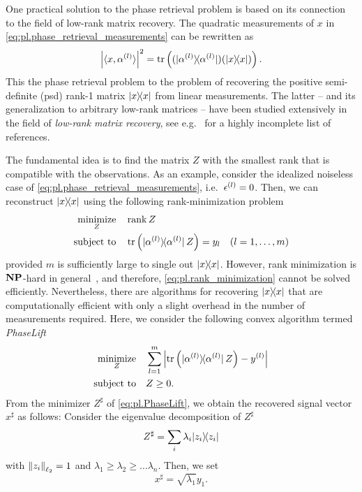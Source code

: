 One practical solution to the phase retrieval problem is based on its connection to the field of low-rank matrix recovery.
The quadratic measurements of $x$ in \cref{eq:pl.phase_retrieval_measurements} can be rewritten as
\[
  \left| \langle {x}, \alpha^{(l)} \rangle \right|^2
  = \tr \left( (\ket{\alpha^{(l)}}\bra{\alpha^{(l)}}) (\ket{{x}}\bra{{x}}) \right).
\]
This  the phase retrieval problem to the problem of recovering the positive semi-definite (psd) rank-1 matrix $\ketbra{x}$ from linear measurements.
The latter -- and its generalization to arbitrary low-rank matrices -- have been studied extensively in the field of \emph{low-rank matrix recovery}, see e.g.~\cite{Ahmed_2014_Blind,Candes_2009_Exact,Candes_2011_Tight,Recht_2010_Guaranteed,Gross_2011_Recovering,Chen_2015_IncoherenceOptimal} for a highly incomplete list of references.

The fundamental idea is to find the matrix $Z$ with the smallest rank that is compatible with the observations.
As an example, consider the idealized noiseless case of \cref{eq:pl.phase_retrieval_measurements}, i.e.\ $\epsilon^{(l)} = 0$.
Then, we can reconstruct $\ketbra{x}$ using the following rank-minimization problem
\[
  \begin{split}
    \underset{{Z}}{\textrm{minimize}} &\quad \rank Z \\
    \textrm{subject to} &\quad  \tr\left( \ketbra{\alpha\ind{l}} \, Z \right) = y_l \quad (l=1,\ldots,m)
  \end{split}
  \label{eq:pl.rank_minimization}
\]
provided $m$ is sufficiently large to single out $\ketbra{x}$.
However, rank minimization is $\mathbf{NP}$-hard in general~\cite{Boyd}, and therefore, \cref{eq:pl.rank_minimization} cannot be solved efficiently.
Nevertheless, there are algorithms for recovering $\ketbra{x}$ that are computationally efficient with only a slight overhead in the number of measurements required.
Here, we consider the following convex algorithm termed \emph{PhaseLift}~\cite{Candes_2013_Phaselift}
\[
  \label{eq:pl.PhaseLift}
  \begin{split}
    \underset{{Z}}{\textrm{minimize}} & \quad \sum_{l=1}^m \left| \tr \left( \ket{\alpha^{(l)}} \bra{\alpha^{(l)}} \, {Z} \right) - y^{(l)} \right| \\
    \textrm{subject to} &\quad  {Z} \geq 0. \nonumber
  \end{split}
\]
From the minimizer $Z^\sharp$ of \cref{eq:pl.PhaseLift}, we obtain the recovered signal vector ${ x}^\sharp$ as follows:
Consider the eigenvalue decomposition of $Z^\sharp$
\[
  Z^\sharp = \sum_i \lambda_i \ketbra{z_i}
\]
with ${\Vert z_i\Vert}_{\ell_2} = 1$ and $\lambda_1 \ge \lambda_2 \ge \ldots \lambda_n$.
Then, we set
\[
  x^\sharp = \sqrt{\lambda_1} y_1.
\]

